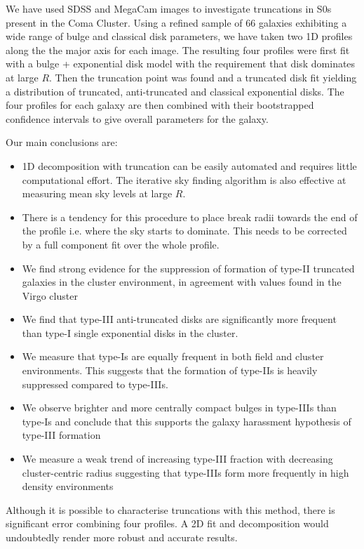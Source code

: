 
We have used SDSS and MegaCam \iband images to investigate truncations in S0s present in the Coma Cluster. Using a refined sample of 66 galaxies exhibiting a wide range of bulge and classical disk parameters, we have taken two 1D profiles along the the major axis for each image. The resulting four profiles were first fit with a \sersic bulge + exponential disk model with the requirement that disk dominates at large $R$. Then the truncation point was found and a truncated disk fit yielding a distribution of truncated, anti-truncated and classical exponential disks. The four profiles for each galaxy are then combined with their bootstrapped confidence intervals to give overall parameters for the galaxy.

Our main conclusions are:
\begin{itemize}
	\item 1D decomposition with truncation can be easily automated and requires little computational effort. The iterative sky finding algorithm is also effective at measuring mean sky levels at large $R$.
	\item There is a tendency for this procedure to place break radii towards the end of the profile i.e. where the sky starts to dominate. This needs to be corrected by a full component fit over the whole profile.
	\item We find strong evidence for the suppression of formation of type-II truncated galaxies in the cluster environment, in agreement with values found in the Virgo cluster \citep{erwin_strong_2012}
	\item We find that type-III anti-truncated disks are significantly more frequent than type-I single exponential disks in the cluster. 
	\item We measure that type-Is are equally frequent in both field and cluster environments. This suggests that the formation of type-IIs is heavily suppressed compared to type-IIIs.
	\item We observe brighter and more centrally compact bulges in type-IIIs than type-Is and conclude that this supports the galaxy harassment hypothesis of type-III formation
	\item We measure a weak trend of increasing type-III fraction with decreasing cluster-centric radius suggesting that type-IIIs form more frequently in high density environments
\end{itemize}

Although it is possible to characterise truncations with this method, there is significant error combining four profiles. A 2D fit and decomposition would undoubtedly render more robust and accurate results.